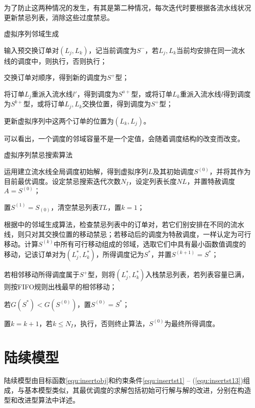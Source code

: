 为了防止这两种情况的发生，有其是第二种情况，每次迭代时要根据各流水线状况更新禁忌列表，消除这些过度禁忌。
\begin{algori}
虚拟序列邻域生成\label{alg:vituralneighbor}
\begin{asparaenum}
\renewcommand{\labelenumi}{\bf Step\theenumi~}
\item 输入预交换订单对$(L_j, L_k)$，记当前调度为$S^-$，若$L_j, L_k$当前均安排在同一流水线的调度中，则执行，否则执行；
\item 交换订单对顺序，得到新的调度为$S^+$型；
\item 将订单$L_j$重派入流水线$l'$，得到调度为$S^{a+}$型，或将订单$L_k$重派入流水线$l$得到调度为$S^{b+}$型，或将订单$L_j, L_k$交换位置，得到调度为$S^+$型；
\item 更新虚拟序列中这两个订单的位置为$(L_k, L_j)$。
\end{asparaenum}
\end{algori}
可以看出，一个调度的邻域容量不是一个定值，会随着调度结构的改变而改变。

\begin{algori}
虚拟序列禁忌搜索算法\label{alg:basicvirtual}
\begin{asparaenum}
\renewcommand{\labelenumi}{\bf Step\theenumi~}
\item 运用建立流水线全局调度初始解，得到虚拟序列$L$及其初始调度$S^{(0)}$，并将其作为目前最优调度。设定禁忌搜索迭代次数$N_I$，设定列表长度$NL$，并置特赦调度$A = S^{(0)}$；
\item 置$S^{(1)} = S_{(0)}$，清空禁忌列表$TL$，置$k = 1$；
\item 根据中的邻域生成算法，检查禁忌列表中的订单对，若它们别安排在不同的流水线，则只对其交换位置的移动禁忌；若移动后的调度为特赦调度，一样认定为可行移动。计算$S^{(k)}$中所有可行移动组成的邻域，选取它们中具有最小函数值调度的移动，记该订单对为$(L_j^*, L_k^*)$，所得调度记为$S^*$，并置$S^{(k+1)} = S^*$；
\item 若相邻移动所得调度属于$S^+$型，则将$(L_j^*, L_k^*)$入栈禁忌列表，若列表容量已满，则按FIFO规则出栈最早的相邻移动；
\item 若$G(S^*) < G(S^{(0)})$，置$S^{(0)} = S^*$；
\item 置$k = k + 1$，若$k\le N_I$，执行，否则终止算法，$S^{(0)}$为最终所得调度。
\end{asparaenum}
\end{algori}


\section{陆续模型}
陆续模型由目标函数\eqref{equ:insertobj}和约束条件\eqref{equ:insertst1} -- (\ref{equ:insertst13})组成，与基本模型类似，其最优调度的求解包括初始可行解与解的改进，分别在构造型和改进型算法中详述。

